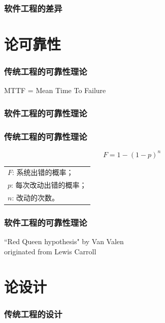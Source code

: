 \begin{frame}
    \frametitle{软件工程的差异}
\end{frame}

\section{论可靠性}

\begin{frame}
    \frametitle{传统工程的可靠性理论}
    \begin{center}
        \large
        MTTF = Mean Time To Failure
    \end{center}
\end{frame}

\begin{frame}
    \frametitle{软件工程的可靠性理论}
\end{frame}

\begin{frame}
    \frametitle{传统工程的可靠性理论}
    \[
    F=1-(1-p)^n
    \]
    \begin{center}
        \begin{tabu}{l}
            $F$: 系统出错的概率；\\
            $p$: 每次改动出错的概率；\\
            $n$: 改动的次数。
        \end{tabu}
    \end{center}
\end{frame}

\begin{frame}
    \frametitle{软件工程的可靠性理论}
        {``Red Queen hypothesis" by Van Valen\\originated from Lewis Carroll}
\end{frame}

\section{论设计}

\begin{frame}
    \frametitle{传统工程的设计}
\end{frame}

